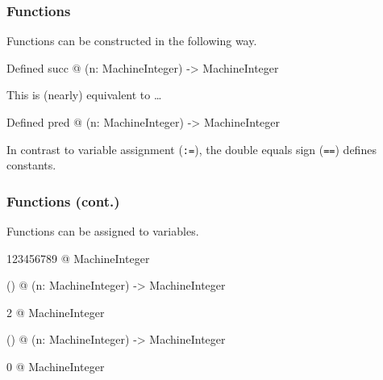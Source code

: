 \begin{frame}[fragile]
  \frametitle<presentation>{Functions}
  Functions can be constructed in the following way.

\begin{myverbatim}
Defined succ @ (n: MachineInteger) -> MachineInteger
\end{myverbatim}

  This is (nearly) equivalent to \ldots
\begin{myverbatim}
Defined pred @ (n: MachineInteger) -> MachineInteger
\end{myverbatim}
In contrast to variable assignment (\texttt{:=}), the double equals
sign (\texttt{==}) defines constants.
\end{frame}









\begin{frame}[fragile]
  \frametitle<presentation>{Functions (cont.)}

  Functions can be assigned to variables.

\begin{myverbatim}
123456789 @ MachineInteger

  () @ (n: MachineInteger) -> MachineInteger

2 @ MachineInteger

  () @ (n: MachineInteger) -> MachineInteger

0 @ MachineInteger
\end{myverbatim}
\end{frame}

















